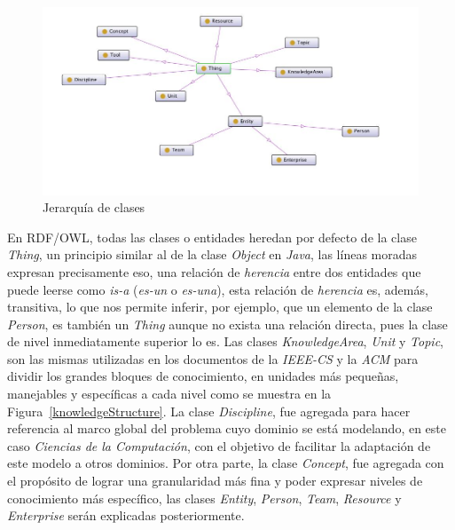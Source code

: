 \begin{itemize}
\newpage

\begin{figure}
    \begin{center}
        \includegraphics[scale=0.5]{images/onto_graph_classes.jpg}
        \caption{Jerarquía de clases}
        \label{classHierarchy}
    \end{center}
\end{figure}

En RDF/OWL, todas las clases o entidades heredan por defecto de la clase \textit{Thing}, un principio similar al de la clase \textit{Object} en \textit{Java}, las líneas moradas expresan precisamente eso, una relación de \textit{herencia} entre dos entidades que puede leerse como \textit{is-a} (\textit{es-un} o \textit{es-una}), esta relación de \textit{herencia} es, además, transitiva, lo que nos permite inferir, por ejemplo, que un elemento de la clase \textit{Person}, es también un \textit{Thing} aunque no exista una relación directa, pues la clase de nivel inmediatamente superior lo es. Las clases \textit{KnowledgeArea}, \textit{Unit} y \textit{Topic}, son las mismas utilizadas en los documentos de la \textit{IEEE-CS} y la \textit{ACM} para dividir los grandes bloques de conocimiento, en unidades más pequeñas, manejables y específicas a cada nivel como se muestra en la Figura~\ref{knowledgeStructure}. La clase \textit{Discipline}, fue agregada para hacer referencia al marco global del problema cuyo dominio se está modelando, en este caso \textit{Ciencias de la Computación}, con el objetivo de facilitar la adaptación de este modelo a otros dominios. Por otra parte, la clase \textit{Concept}, fue agregada con el propósito de lograr una granularidad más fina y poder expresar niveles de conocimiento más específico, las clases \textit{Entity}, \textit{Person}, \textit{Team}, \textit{Resource} y \textit{Enterprise} serán explicadas posteriormente.
\newpage


\end{itemize}
